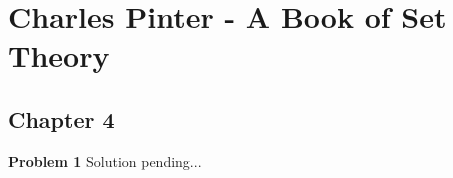 \documentclass{article}
\begin{document}
\section*{Charles Pinter - A Book of Set Theory}
\subsection*{Chapter 4}

\textbf{Problem 1}
Solution pending...
\end{document}

